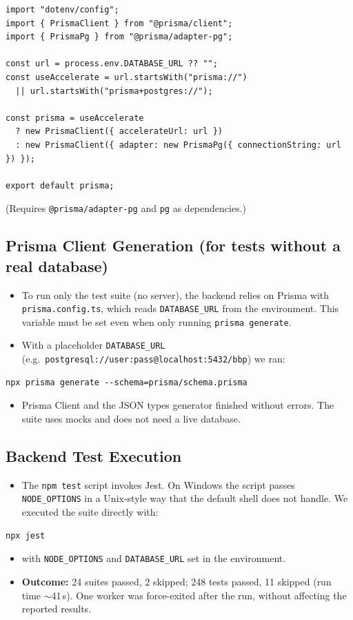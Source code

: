 \begin{verbatim}
import "dotenv/config";
import { PrismaClient } from "@prisma/client";
import { PrismaPg } from "@prisma/adapter-pg";

const url = process.env.DATABASE_URL ?? "";
const useAccelerate = url.startsWith("prisma://")
  || url.startsWith("prisma+postgres://");

const prisma = useAccelerate
  ? new PrismaClient({ accelerateUrl: url })
  : new PrismaClient({ adapter: new PrismaPg({ connectionString: url }) });

export default prisma;
\end{verbatim}

(Requires \texttt{@prisma/adapter-pg} and \texttt{pg} as dependencies.)

\subsection{Prisma Client Generation (for tests without a real database)}
\begin{itemize}
    \item To run only the test suite (no server), the backend relies on Prisma with \texttt{prisma.config.ts}, which reads \texttt{DATABASE\_URL} from the environment. This variable must be set even when only running \texttt{prisma generate}.
    \item With a placeholder \texttt{DATABASE\_URL} (e.g.\ \texttt{postgresql://user:pass@localhost:5432/bbp}) we ran:
\end{itemize}
\begin{verbatim}
npx prisma generate --schema=prisma/schema.prisma
\end{verbatim}
\begin{itemize}
    \item Prisma Client and the JSON types generator finished without errors. The suite uses mocks and does not need a live database.
\end{itemize}

\subsection{Backend Test Execution}
\begin{itemize}
    \item The \texttt{npm test} script invokes Jest. On Windows the script passes \texttt{NODE\_OPTIONS} in a Unix-style way that the default shell does not handle. We executed the suite directly with:
\end{itemize}
\begin{verbatim}
npx jest
\end{verbatim}
\begin{itemize}
    \item with \texttt{NODE\_OPTIONS} and \texttt{DATABASE\_URL} set in the environment.
    \item \textbf{Outcome:} 24 suites passed, 2 skipped; 248 tests passed, 11 skipped (run time $\sim$41\,s). One worker was force-exited after the run, without affecting the reported results.
\end{itemize}

